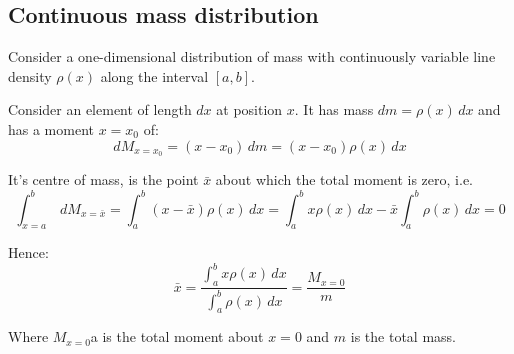 \documentclass[11pt]{article}
\begin{document}
\subsection{Continuous mass distribution}
\label{sec:orga4c48e4}
Consider a one-dimensional distribution of mass with continuously variable line density \(\rho(x)\) along the interval \([a, b]\).


Consider an element of length \(dx\) at position \(x\). It has mass \(dm = \rho(x) \, dx\) and has a moment \(x = x_0\) of:
\[dM_{x = x_0} = (x - x_0) \, dm = (x - x_0) \rho(x) \, dx\]

It's centre of mass, is the point \(\bar{x}\) about which the total moment is zero, i.e.
\[\int_{x = a}^b \, dM_{x = \bar{x}} = \int_a^b (x - \bar{x}) \rho (x) \, dx = \int_a^b x \rho (x) \, dx - \bar{x} \int_a^b \rho(x) \, dx = 0\]

Hence:
\[\bar{x} = \frac{\int_a^b x \rho(x) \, dx}{\int_a^b \rho(x) \, dx} = \frac{M_{x = 0}}{m}\]

Where \(M_{x = 0}\)a is the total moment about \(x = 0\) and \(m\) is the total mass.
\end{document}
